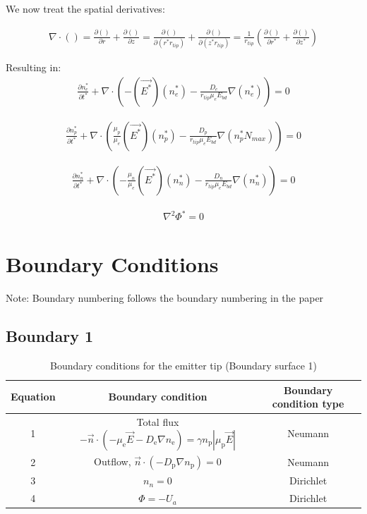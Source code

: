 \documentclass[12pt, a4paper]{report}
\begin{document}
\noindent
We now treat the spatial derivatives:

\begin{align*}
    \nabla \cdot () = \frac{\partial()}{\partial r} + \frac{\partial()}{\partial z} = \frac{\partial()}{\partial (r^*r_{tip})} + \frac{\partial()}{\partial (z^*r_{tip})} = \frac{1}{r_{tip}}\left(\frac{\partial()}{\partial r^*} + \frac{\partial()}{\partial z^*}\right)
\end{align*}

\noindent
Resulting in:
\begin{align*}
        \frac{\partial n_e^* }{\partial t^*} +  \nabla \cdot \left(-(\vec{E^*})(n_e^*) - \frac{{D_e}}{r_{tip}\mu_e E_{bd}}\nabla (n_e^*)\right) = 0
\end{align*}

\begin{align*}
    \frac{\partial n_p^*}{\partial t^*} + \nabla \cdot \left(\frac{\mu_p}{\mu_e}(\vec{E^*})(n_p^*) - \frac{D_p}{r_{tip}\mu_eE_{bd}}\nabla (n_p^*N_{max})\right) = 0
\end{align*}

\begin{align*}
    \frac{\partial n_n^*}{\partial t^*} + \nabla \cdot \left(-\frac{\mu_n}{\mu_e}(\vec{E^*})(n_n^*) - \frac{D_n}{r_{tip}\mu_e E_{bd}}\nabla (n_n^*)\right) = 0
\end{align*}

\begin{align*}
    \nabla^2\Phi^* = 0
\end{align*}

\section{\bf \large Boundary Conditions}
Note: Boundary numbering follows the boundary numbering in the paper
\subsection{Boundary 1}

\begin{table}[!h]
    \centering\begin{tabular}{c|c|c}
        Equation & Boundary condition & Boundary condition type\\ \hline
        1 & Total flux $-\vec{n} \cdot\left(-\mu_{\mathrm{e}} \vec{E} -D_{\mathrm{e}} \nabla n_{\mathrm{e}}\right) =\gamma n_{\mathrm{p}}|\mu_{\mathrm{p}} \vec{E}|$ & Neumann \\ \hline
        2 & Outflow, $\vec{n} \cdot\left(-D_{\mathrm{p}} \nabla n_{\mathrm{p}}\right)=0$  & Neumann \\ \hline
        3 & $n_n=0$ & Dirichlet\\ \hline
        4 & $\Phi=-U_a$ & Dirichlet \\ \hline

    \end{tabular}
    \caption{Boundary conditions for the emitter tip (Boundary surface 1)}
\end{table}
\clearpage
\end{document}
